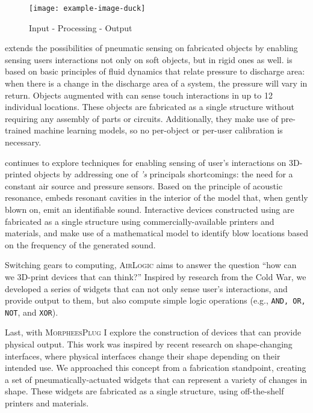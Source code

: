         \begin{figure}[h]
          \centering
          \texttt{[image: example-image-duck]}
          \label{fig:stack}
          \caption{Input - Processing - Output}
        \end{figure}

        \textsc{\at} extends the possibilities of pneumatic sensing on
        fabricated objects by enabling sensing users interactions not only on
        soft objects, but in rigid ones as well. \emph{\at} is based on basic
        principles of fluid dynamics that relate pressure to discharge area:
        when there is a change in the discharge area of a system, the pressure
        will vary in return. Objects augmented with \emph{\at} can sense touch
        interactions in up to 12 individual locations. These objects are
        fabricated as a single structure without requiring any assembly of parts
        or circuits. Additionally, they make use of pre-trained machine learning
        models, so no per-object or per-user calibration is necessary.
        
        \textsc{\bh} continues to explore techniques for enabling sensing of
        user's interactions on 3D-printed objects by addressing one of
        \emph{\at's} principals shortcomings: the need for a constant air source
        and pressure sensors. Based on the principle of acoustic resonance,
        \emph{\bh} embeds resonant cavities in the interior of the model that,
        when gently blown on, emit an identifiable sound. Interactive devices
        constructed using \emph{\bh} are fabricated as a single structure using
        commercially-available printers and materials, and make use of a
        mathematical model to identify blow locations based on the frequency of
        the generated sound.

        Switching gears to computing, \textsc{AirLogic} aims to answer the
        question ``how can we 3D-print devices that can think?'' Inspired by
        research from the Cold War, we developed a series of widgets that can
        not only sense user's interactions, and provide output to them, but also
        compute simple logic operations (e.g., \texttt{AND, OR, NOT}, and
        \texttt{XOR}).

        Last, with \textsc{MorpheesPlug} I explore the construction of devices
        that can provide physical output. This work was inspired by recent
        research on shape-changing interfaces, where physical interfaces change
        their shape depending on their intended use. We approached this concept
        from a fabrication standpoint, creating a set of pneumatically-actuated
        widgets that can represent a variety of changes in shape. These widgets
        are fabricated as a single structure, using off-the-shelf printers and
        materials.